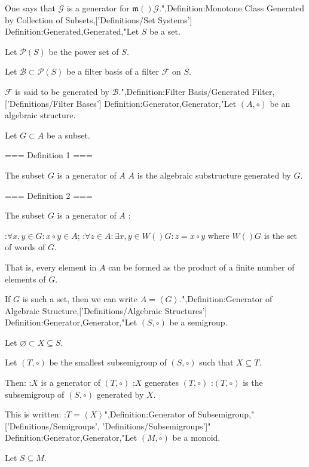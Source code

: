 One says that $\mathcal G$ is a generator for $\mathfrak m \left(   \right)\mathcal G$.",Definition:Monotone Class Generated by Collection of Subsets,['Definitions/Set Systems']
Definition:Generated,Generated,"Let $S$ be a set.

Let $\mathcal P \left( S \right)$ be the power set of $S$.

Let $\mathcal B \subset \mathcal P \left( S \right)$ be a filter basis of a filter $\mathcal F$ on $S$.


$\mathcal F$ is said to be generated by $\mathcal B$.",Definition:Filter Basis/Generated Filter,['Definitions/Filter Bases']
Definition:Generator,Generator,"Let $\left( A, \circ \right)$ be an algebraic structure.

Let $G \subset A$ be a subset.


=== Definition 1 ===

The subset $G$ is a generator of $A$  $A$ is the algebraic substructure generated by $G$.


=== Definition 2 ===

The subset $G$ is a generator of $A$ :

:$\forall x, y \in G: x \circ y \in A$;
:$\forall z \in A: \exists x, y \in W \left(   \right)G: z = x \circ y$
where $W \left(   \right)G$ is the set of words of $G$.

That is, every element in $A$ can be formed as the product of a finite number of elements of $G$.


If $G$ is such a set, then we can write $A = {\left\langle G \right\rangle}$.",Definition:Generator of Algebraic Structure,['Definitions/Algebraic Structures']
Definition:Generator,Generator,"Let $\left( S, \circ \right)$ be a semigroup.

Let $\varnothing \subset X \subseteq S$.

Let $\left( T, \circ \right)$ be the smallest subsemigroup of $\left( S, \circ \right)$ such that $X \subseteq T$.


Then:
:$X$ is a generator  of $\left( T, \circ \right)$
:$X$ generates $\left( T, \circ \right)$
:$\left( T, \circ \right)$ is the subsemigroup of $\left( S, \circ \right)$ generated by $X$.


This is written:
:$T = {\left\langle X \right\rangle}$",Definition:Generator of Subsemigroup,"['Definitions/Semigroups', 'Definitions/Subsemigroups']"
Definition:Generator,Generator,"Let $\left( M, \circ \right)$ be a monoid.

Let $S \subseteq M$.

